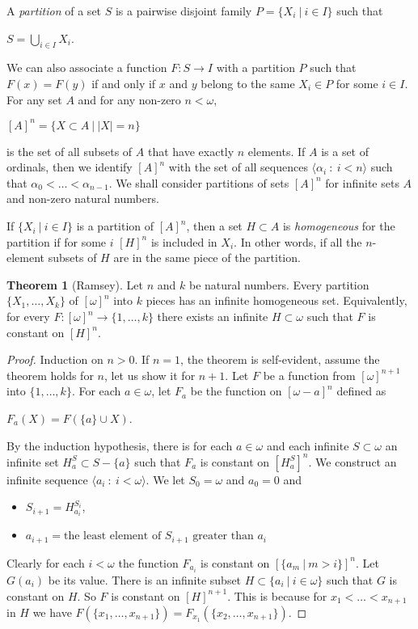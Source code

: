 \documentclass[8pt]{article}
\theoremstyle{definition}
\theoremstyle{definition}
\newtheorem{theorem}{Theorem}[section]
\theoremstyle{definition}
\theoremstyle{definition}
\theoremstyle{definition}
\theoremstyle{definition}
\theoremstyle{definition}
\theoremstyle{definition}
\theoremstyle{definition}
\theoremstyle{definition}
\theoremstyle{definition}
\theoremstyle{definition}
\theoremstyle{definition}
\theoremstyle{definition}
\theoremstyle{question}
\begin{document}
A \emph{partition} of a set $S$ is a pairwise disjoint family $P = \{ X_i \: | \: i \in I \}$ such that
\begin{center}
$S = \bigcup \limits_{i \in I} X_i$.
\end{center}
We can also associate a function $F : S \to I$ with a partition $P$ such that $F(x) = F(y)$ if and only if
$x$ and $y$ belong to the same $X_i \in P$ for some $i \in I$.
For any set $A$ and for any non-zero $n < \omega$,
\begin{center}
  $[A]^n = \{ X \subset A \: | \: |X| = n \}$
\end{center}
is the set of all subsets of $A$ that have exactly $n$ elements. If $A$ is a set of ordinals, then
we identify $[A]^n$ with the set of all sequences $\langle \alpha_i \: : \: i < n \rangle$ such that
$\alpha_0 < \ldots < \alpha_{n - 1}$. We shall consider partitions of sets $[A]^n$ for infinite sets $A$
and non-zero natural numbers.

If $\{ X_i \: | \: i \in I \}$ is a partition of $[A]^n$, then a set $H \subset A$ is \emph{homogeneous}
for the partition if for some $i$ $[H]^n$ is included in $X_i$. In other words,
if all the $n$-element subsets of $H$ are in the same piece of the partition.

\begin{theorem}[Ramsey] Let $n$ and $k$ be natural numbers. Every partition $\{ X_1, \dots, X_k \}$ 
  of $[\omega]^n$ into $k$ pieces has an infinite homogeneous set.
  Equivalently, for every $F : [\omega]^n \to \{ 1, \ldots, k \}$ there exists an infinite $H \subset \omega$
  such that $F$ is constant on $[H]^n$.
\end{theorem}
 
\begin{proof}
  Induction on $n > 0$. If $n = 1$, the theorem is self-evident, assume the theorem holds
  for $n$, let us show it for $n + 1$. Let $F$ be a function from $[\omega]^{n + 1}$ into
  $\{ 1, \ldots, k\}$. For each $a \in \omega$, let $F_a$ be the function on $[\omega - {a}]^n$ defined as
  \begin{center}
    $F_a(X) = F(\{a\} \cup X)$.
  \end{center}
  By the induction hypothesis, there is for each $a \in \omega$ and each infinite $S \subset \omega$
  an infinite set $H^S_a \subset S - \{ a \}$ such that $F_a$ is constant on $[H^S_a]^n$.
  We construct an infinite sequence $\langle a_i \: : \: i < \omega \rangle$.
  We let $S_0 = \omega$ and $a_0 = 0$ and
  \begin{itemize}
    \item $S_{i + 1} = H^{S_i}_{a_i}$,
    \item $a_{i + 1} = \text{the least element of $S_{i + 1}$ greater than $a_i$}$
  \end{itemize}
  Clearly for each $i < \omega$ the function $F_{a_i}$ is constant on $[\{ a_m \: | \: m > i \}]^n$.
  Let $G(a_i)$ be its value. There is an infinite subset $H \subset \{a_i \: | \: i \in \omega \}$
  such that $G$ is constant on $H$. So $F$ is constant on $[H]^{n + 1}$. This is because
  for $x_1 < \ldots < x_{n + 1}$ in $H$ we have $F(\{x_1, \ldots, x_{n + 1}\}) = F_{x_1}(\{ x_2, \ldots, x_{n + 1}\})$.
\end{proof}
\end{document}
